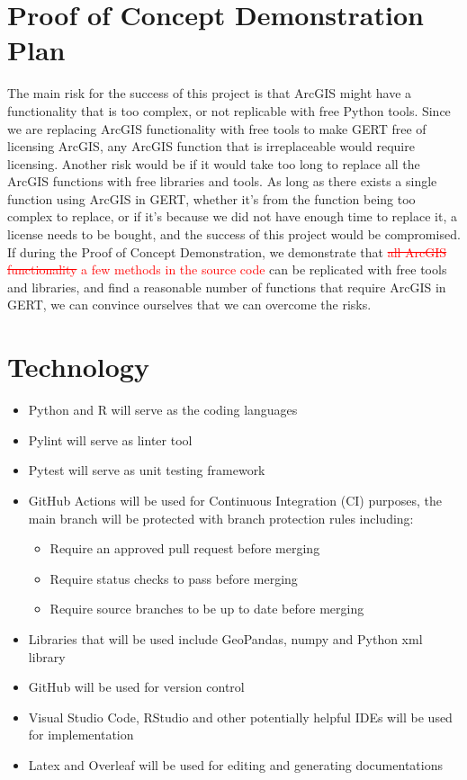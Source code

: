 \documentclass{article}
\begin{document}
\section{Proof of Concept Demonstration Plan}

The main risk for the success of this project is that ArcGIS might have a functionality that is too complex, or not replicable with free Python tools. Since we are replacing ArcGIS functionality with free tools to make GERT free of licensing ArcGIS, any ArcGIS function that is irreplaceable would require licensing. Another risk would be if it would take too long to replace all the ArcGIS functions with free libraries and tools. As long as there exists a single function using ArcGIS in GERT, whether it's from the function being too complex to replace, or if it's because we did not have enough time to replace it, a license needs to be bought, and the success of this project would be compromised. If during the Proof of Concept Demonstration, we demonstrate that \textcolor{red}{\sout{all ArcGIS functionality}} \textcolor{red}{a few methods in the source code} can be replicated with free tools and libraries, and find a reasonable number of functions that require ArcGIS in GERT, we can convince ourselves that we can overcome the risks.

\section{Technology}

\begin{itemize}
\item Python and R will serve as the coding languages
\item Pylint will serve as linter tool
\item Pytest will serve as unit testing framework
\item GitHub Actions will be used for Continuous Integration (CI) purposes, the main branch will be protected with branch protection rules including:
    \begin{itemize}
        \item Require an approved pull request before merging
        \item Require status checks to pass before merging
        \item Require source branches to be up to date before merging
    \end{itemize}
\item Libraries that will be used include GeoPandas, numpy and Python xml library 
\item GitHub will be used for version control 
\item Visual Studio Code, RStudio and other potentially helpful IDEs will be used for implementation
\item Latex and Overleaf will be used for editing and generating documentations
\end{itemize}
\end{document}
